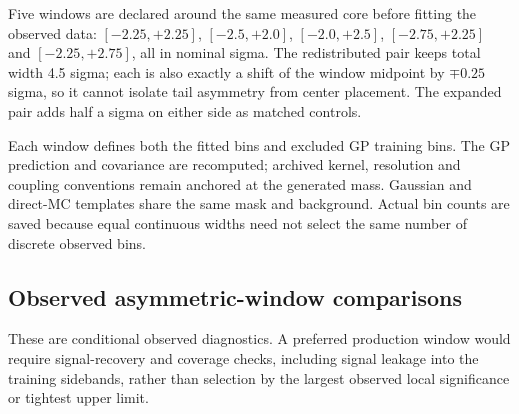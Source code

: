 Five windows are declared around the same measured core before fitting
the observed data: $[-2.25,+2.25]$, $[-2.5,+2.0]$, $[-2.0,+2.5]$,
$[-2.75,+2.25]$ and $[-2.25,+2.75]$, all in nominal sigma.
The redistributed pair keeps total width 4.5 sigma; each is also exactly
a shift of the window midpoint by $\mp0.25$ sigma, so it cannot isolate
tail asymmetry from center placement. The expanded pair adds half a
sigma on either side as matched controls.

Each window defines both the fitted bins and excluded GP training bins.
The GP prediction and covariance are recomputed; archived kernel,
resolution and coupling conventions remain anchored at the generated
mass. Gaussian and direct-MC templates share the same mask and background.
Actual bin counts are saved because equal continuous widths need not
select the same number of discrete observed bins.

\clearpage
\subsection{Observed asymmetric-window comparisons}
\begin{table}[H]\centering\scriptsize

\caption{Prespecified native-mass window comparisons. The minimum local
probability is descriptive and is not corrected for testing several
windows. No prescription is chosen from the observed result.}
\end{table}
These are conditional observed diagnostics. A preferred production
window would require signal-recovery and coverage checks, including
signal leakage into the training sidebands, rather than selection by
the largest observed local significance or tightest upper limit.
